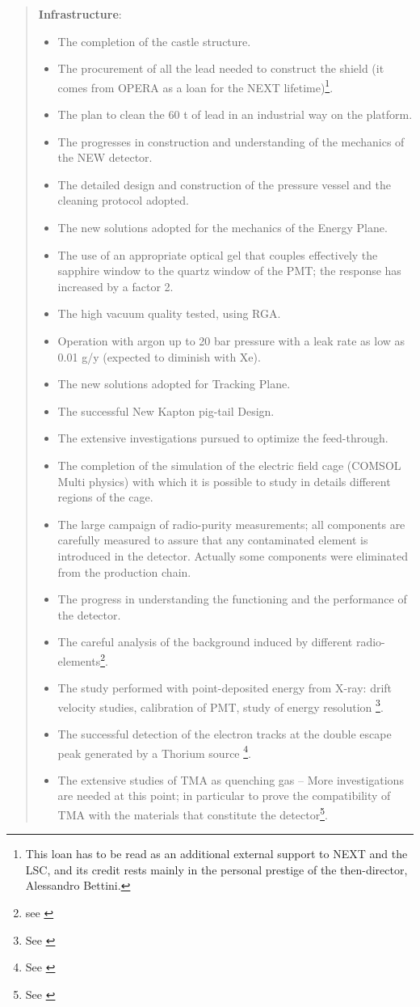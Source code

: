 \begin{quotation}
{\bf Infrastructure}:
\begin{itemize}
\item The completion of the castle structure.
\item The procurement of all the lead needed to construct the shield (it comes from OPERA as a loan for the NEXT lifetime)\footnote{This loan has to be read as an additional external support to NEXT and the LSC, and its credit rests mainly in the personal prestige of the then-director, Alessandro Bettini.}. 
\item The plan to clean the 60 t of lead in an industrial way on the platform.
\item The progresses in construction and understanding of the mechanics of the NEW detector.
\item The detailed design and construction of the pressure vessel and the cleaning protocol adopted.
\item The new solutions adopted for the mechanics of the Energy Plane.
\item The use of an appropriate optical gel that couples effectively the sapphire window to the quartz window of the PMT; the response has increased by a factor 2.
\item The high vacuum quality tested, using RGA.
\item Operation with argon up to 20 bar pressure with a leak rate as low as 0.01 g/y (expected to diminish with Xe).
\item The new solutions adopted for Tracking Plane.
\item The successful New Kapton pig-tail Design.
\item The extensive investigations pursued to optimize the feed-through.
\item The completion of the simulation of the electric field cage (COMSOL Multi physics) with which it is possible to study in details different regions of the cage.
\item The large campaign of radio-purity measurements; all components are carefully measured to assure that any contaminated element is introduced in the detector. Actually some components were eliminated from the production chain.
\item The progress in understanding the functioning and the performance of the detector.
\item The careful analysis of the background induced by different radio-elements\footnote{see 
\cite{Martin-Albo:2015rhw}}.
\item The study performed with point-deposited energy from X-ray: drift velocity studies, calibration of PMT, study of energy resolution \footnote{See \cite{Lorca:2014sra}}.
\item The successful detection of the electron tracks at the double escape peak generated by a Thorium source  \footnote{See \cite{Ferrario:2015kta}}. 
\item The extensive studies of TMA as quenching gas – More investigations are needed at this point; in particular to prove the compatibility of TMA with the materials that constitute the detector\footnote{See \cite{Alvarez:2013oha,Alvarez:2013kqa}}.
\end{itemize}
	


\end{quotation}
